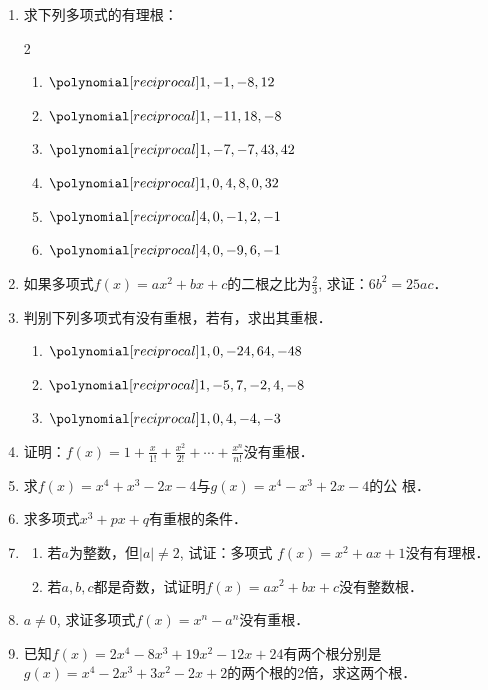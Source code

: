 \begin{enumerate}
    \item 求下列多项式的有理根：
\begin{multicols}{2}
\begin{enumerate}
    \item $\poly{1,-1,-8,12}$
    \item $\poly{1,-11,18,-8}$
    \item $\poly{1,-7,-7,43,42}$
    \item $\poly{1,0,4,8,0,32}$
    \item $\poly{4,0,-1,2,-1}$
    \item $\poly{4,0,-9,6,-1}$
\end{enumerate}
\end{multicols}

\item 如果多项式$f(x)=ax^2+bx+c$的二根之比为$\frac{2}{3}$, 求证：$6b^2=25ac$．

\item 判别下列多项式有没有重根，若有，求出其重根．
\begin{enumerate}
    \item $\poly{1,0,-24,64,-48}$
    \item $\poly{1,-5,7,-2,4,-8}$
    \item $\poly{1,0,4,-4,-3}$
\end{enumerate}

\item 证明：$f(x)=1+\frac{x}{1!}+\frac{x^2}{2!}+\cdots+\frac{x^n}{n!}$没有重根．

\item 求$f(x)=x^4+x^3-2x-4$与$g(x)=x^4-x^3+2x-4$的公
根．

\item 求多项式$x^3+px+q$有重根的条件．

\item \begin{enumerate}
    \item 若$a$为整数，但$|a|\ne 2$, 试证：多项式
$f (x) =x^2+ax+1$没有有理根．
\item 若$a,b,c$都是奇数，试证明$f(x)=ax^2+bx+c$没有整数根．
\end{enumerate}


\item $a\ne 0$, 求证多项式$f(x)=x^n-a^n$没有重根．

\item 已知$f(x)=2x^4-8x^3+19x^2-12x+24$有两个根分别是
$g(x)=x^4-2x^3+3x^2-2x+2$的两个根的2倍，求这两个根．


\end{enumerate}
